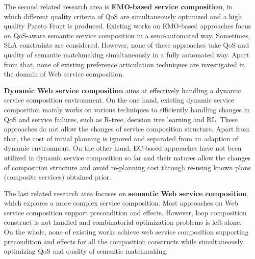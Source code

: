 
The second related research area is \textbf{EMO-based service composition}, in which different quality criteria of QoS are simultaneously optimized and a high quality Pareto Front is produced. Existing works on EMO-based approaches focus on QoS-aware semantic service composition in a semi-automated way. Sometimes, SLA constraints are considered. However, none of these approaches take QoS and quality of semantic matchmaking simultaneously in a fully automated way. Apart from that, none of existing preference articulation techniques are investigated in the domain of Web service composition.

\textbf{Dynamic Web service composition} aims at effectively handling a dynamic service composition environment. On the one hand, existing dynamic service composition mainly works on various techniques to efficiently handling changes in QoS and service failures, such as R-tree, decision tree learning and RL. These approaches do not allow the changes of service composition structure. Apart from that, the cost of initial planning is ignored and separated from an adaption of dynamic environment. On the other hand, EC-based approaches have not been utilized in dynamic service composition so far and their natures allow the changes of composition structure and avoid re-planning cost through re-using known plans (composite services) obtained prior. 


The last related research area focuses on \textbf{semantic Web service composition}, which explores a more complex service composition. Most approaches on Web service composition support precondition and effects. However, loop composition construct is not handled and combinatorial optimization problems is left alone. On the whole, none of existing works achieve web service composition supporting precondition and effects for all the composition constructs while simultaneously  optimizing QoS and quality of semantic matchmaking.
